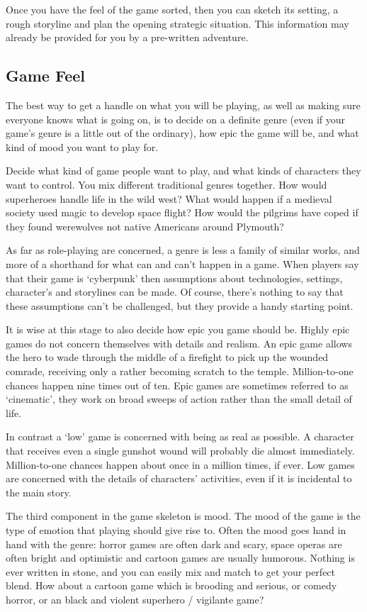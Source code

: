 \documentclass[twoside]{book}
\begin{document}
Once you have the feel of the game sorted, then you can sketch its
setting, a rough storyline and plan the opening strategic
situation. This information may already be provided for you by a
pre-written adventure.

\subsection{Game Feel}

The best way to get a handle on what you will be playing, as well as
making sure everyone knows what is going on, is to decide on a
definite genre (even if your game's genre is a little out of the
ordinary), how epic the game will be, and what kind of mood you want
to play for.

Decide what kind of game people want to play, and what kinds of
characters they want to control. You mix different traditional genres
together. How would superheroes handle life in the wild west? What
would happen if a medieval society used magic to develop space flight?
How would the pilgrims have coped if they found werewolves not native
Americans around Plymouth?

As far as role-playing are concerned, a genre is less a family of
similar works, and more of a shorthand for what can and can't happen
in a game. When players say that their game is `cyberpunk' then
assumptions about technologies, settings, character's and storylines
can be made. Of course, there's nothing to say that these assumptions
can't be challenged, but they provide a handy starting point.

It is wise at this stage to also decide how epic you game should
be. Highly epic games do not concern themselves with details and
realism. An epic game allows the hero to wade through the middle of a
firefight to pick up the wounded comrade, receiving only a rather
becoming scratch to the temple. Million-to-one chances happen nine
times out of ten. Epic games are sometimes referred to as `cinematic',
they work on broad sweeps of action rather than the small detail of
life.

In contrast a `low' game is concerned with being as real as
possible. A character that receives even a single gunshot wound will
probably die almost immediately. Million-to-one chances happen about
once in a million times, if ever. Low games are concerned with the
details of characters' activities, even if it is incidental to the
main story.

The third component in the game skeleton is mood. The mood of the game
is the type of emotion that playing should give rise to. Often the
mood goes hand in hand with the genre: horror games are often dark and
scary, space operas are often bright and optimistic and cartoon games
are usually humorous. Nothing is ever written in stone, and you can
easily mix and match to get your perfect blend. How about a cartoon
game which is brooding and serious, or comedy horror, or an black and
violent superhero / vigilante game?
\end{document}
